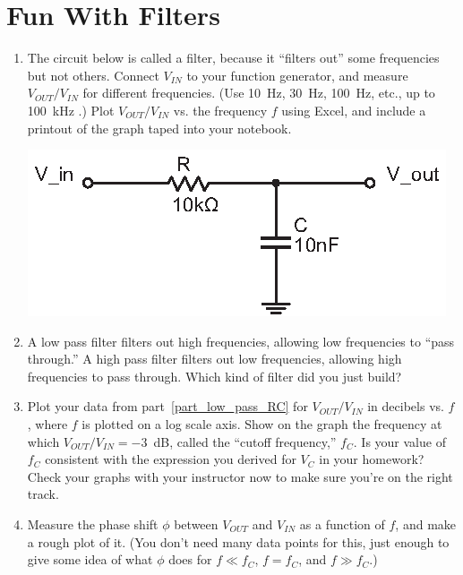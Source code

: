 \section{Fun With Filters}
\label{lab_filters}


\bigskip

\begin{enumerate}[wide]

\item The circuit below is called a filter, because it ``filters out'' some frequencies but not others.  Connect $V_{IN}$ to your function generator, and measure $V_{OUT}/V_{IN}$ for different frequencies.  (Use 10~Hz, 30~Hz, 100~Hz, etc., up to 100~kHz .)  Plot $V_{OUT}/V_{IN}$ vs. the frequency $f$ using Excel, and include a printout of the graph taped into your notebook.  \label{part_low_pass_RC}
\begin{center}
\includegraphics{filters/low_pass_filter_RC.eps}
\end{center}

\item A low pass filter filters out high frequencies, allowing low frequencies to ``pass through.''  A high pass filter filters out low frequencies, allowing high frequencies to pass through.  Which kind of filter did you just build?  

\item Plot your data from part~\ref{part_low_pass_RC} for $V_{OUT}/V_{IN}$ in decibels vs. $f$, where $f$ is plotted on a log scale axis.  Show on the graph the frequency at which $V_{OUT}/V_{IN}=-3$~dB, called the ``cutoff frequency,'' $f_C$.  Is your value of $f_C$ consistent with the expression you derived for $V_C$ in your homework?  Check your graphs with your instructor now to make sure you're on the right track.

\item Measure the phase shift $\phi$ between $V_{OUT}$ and $V_{IN}$ as a function of $f$, and make a rough plot of it.  (You don't need many data points for this, just enough to give some idea of what $\phi$ does for $f \ll f_C$, $f = f_C$, and $f \gg f_C$.)


\end{enumerate}
